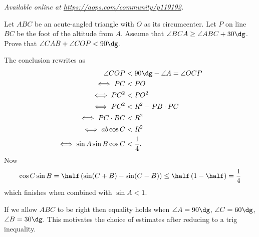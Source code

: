 \textsl{Available online at \url{https://aops.com/community/p119192}.}
\begin{mdframed}[style=mdpurplebox,frametitle={Problem statement}]
Let $ABC$ be an acute-angled triangle with $O$ as its circumcenter.
Let $P$ on line $BC$ be the foot of the altitude from $A$.
Assume that $\angle BCA \ge \angle ABC + 30\dg$.
Prove that $\angle CAB + \angle COP < 90\dg$.
\end{mdframed}
The conclusion rewrites as
\begin{align*}
  \angle COP &< 90\dg - \angle A = \angle OCP \\
  \iff PC &< PO \\
  \iff PC^2 &< PO^2 \\
  \iff PC^2 &< R^2 - PB \cdot PC \\
  \iff PC \cdot BC &< R^2 \\
  \iff ab \cos C  &< R^2 \\
  \iff \sin A \sin B \cos C & < \frac14.
\end{align*}
Now
\[ \cos C \sin B
  = \half \left( \sin(C+B)-\sin(C-B) \right)
  \le \half \left( 1 - \half \right) = \frac 14 \]
which finishes when combined with $\sin A < 1$.

\begin{remark*}
  If we allow $ABC$ to be right then
  equality holds when $\angle A = 90\dg$,
  $\angle C = 60\dg$, $\angle B = 30\dg$.
  This motivates the choice of estimates
  after reducing to a trig inequality.
\end{remark*}
\pagebreak